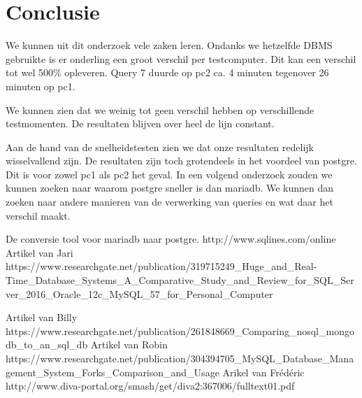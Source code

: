 \documentclass[fleqn,10pt]{artikeltin}
\begin{document}
\section{Conclusie}
\label{sec:conclusie}

We kunnen uit dit onderzoek vele zaken leren. Ondanks we hetzelfde DBMS gebruikte is er onderling een groot verschil per testcomputer. Dit kan een verschil tot wel 500\% opleveren. Query 7 duurde op pc2 ca. 4 minuten tegenover 26 minuten op pc1.

We kunnen zien dat we weinig tot geen verschil hebben op verschillende testmomenten. De resultaten blijven over heel de lijn constant.

 Aan de hand van de snelheidstesten zien we dat onze resultaten redelijk wisselvallend zijn. De resultaten zijn toch grotendeels in het voordeel van postgre. Dit is voor zowel pc1 als pc2 het geval. In een volgend onderzoek zouden we kunnen zoeken naar waarom postgre sneller is dan mariadb. We kunnen dan zoeken naar andere manieren van de verwerking van queries en wat daar het verschil maakt.

 


\printbibliography[heading=bibintoc]

\begin{thebibliography}{8}
    
   De conversie tool voor mariadb naar postgre.
   http://www.sqlines.com/online
    Artikel van Jari\\
https://www.researchgate.net/publication/319715249\_Huge\_and\_Real-Time\_Database\_Systems\_A\_Comparative\_Study\_and\_Review\_for\_SQL\_Server\_2016\_Oracle\_12c\_MySQL\_57\_for\_Personal\_Computer
       
    Artikel van Billy\\
   https://www.researchgate.net/publication/261848669\_Comparing\_nosql\_mongodb\_to\_an\_sql\_db
    Artikel van Robin\\
    https://www.researchgate.net/publication/304394705\_MySQL\_Database\_Management\_System\_Forks\_Comparison\_and\_Usage
Arikel van Frédéric \\
http://www.diva-portal.org/smash/get/diva2:367006/fulltext01.pdf
\end{thebibliography}
\end{document}
